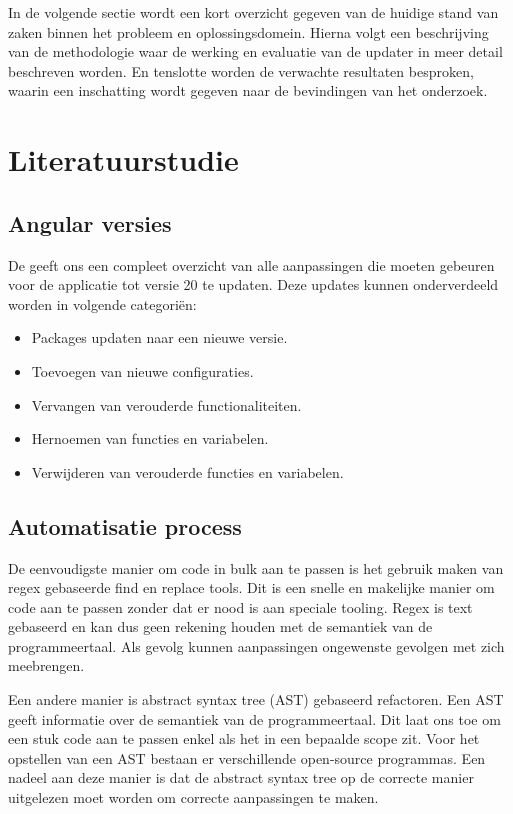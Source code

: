 In de volgende sectie wordt een kort overzicht gegeven van de huidige stand van zaken binnen het probleem en oplossingsdomein.
Hierna volgt een beschrijving van de methodologie waar de werking en evaluatie van de updater in meer detail beschreven worden.
En tenslotte worden de verwachte resultaten besproken, waarin een inschatting wordt gegeven naar de bevindingen van het onderzoek.

\section{Literatuurstudie}
\label{sec:literatuurstudie}

\subsection{Angular versies}

De \textcite{Angular update guide} geeft ons een compleet overzicht van alle aanpassingen die moeten gebeuren voor de applicatie tot versie 20 te updaten. Deze updates kunnen onderverdeeld worden in volgende categoriën:

\begin{itemize}\label{categories}
  \item Packages updaten naar een nieuwe versie.
  \item Toevoegen van nieuwe configuraties.
  \item Vervangen van verouderde functionaliteiten. 
  \item Hernoemen van functies en variabelen.
  \item Verwijderen van verouderde functies en variabelen.
\end{itemize}


\subsection{Automatisatie process}

De eenvoudigste manier om code in bulk aan te passen is het gebruik maken van regex gebaseerde find en replace tools.
Dit is een snelle en makelijke manier om code aan te passen zonder dat er nood is aan speciale tooling.
Regex is text gebaseerd en kan dus geen rekening houden met de semantiek van de programmeertaal.
Als gevolg kunnen aanpassingen ongewenste gevolgen met zich meebrengen.

Een andere manier is abstract syntax tree (AST) gebaseerd refactoren.
Een AST geeft informatie over de semantiek van de programmeertaal.
Dit laat ons toe om een stuk code aan te passen enkel als het in een bepaalde scope zit.
Voor het opstellen van een AST bestaan er verschillende open-source programmas.
Een nadeel aan deze manier is dat de abstract syntax tree op de correcte manier uitgelezen moet worden om correcte aanpassingen te maken.


